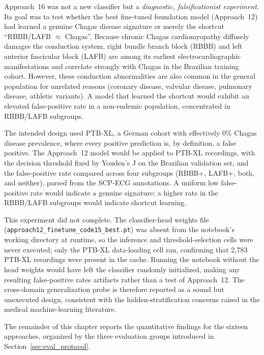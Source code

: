 Approach~16 was not a new classifier but a \emph{diagnostic, falsificationist experiment}. Its goal was to test whether the best fine-tuned foundation model (Approach~12) had learned a genuine Chagas disease signature or merely the shortcut ``RBBB/LAFB $\approx$ Chagas''. Because chronic Chagas cardiomyopathy diffusely damages the conduction system, right bundle branch block (RBBB) and left anterior fascicular block (LAFB) are among its earliest electrocardiographic manifestations and correlate strongly with Chagas in the Brazilian training cohort. However, these conduction abnormalities are also common in the general population for unrelated reasons (coronary disease, valvular disease, pulmonary disease, athletic variants). A model that learned the shortcut would exhibit an elevated false-positive rate in a non-endemic population, concentrated in RBBB/LAFB subgroups.

The intended design used PTB-XL, a German cohort with effectively 0\% Chagas disease prevalence, where every positive prediction is, by definition, a false positive. The Approach~12 model would be applied to PTB-XL recordings, with the decision threshold fixed by Youden's J on the Brazilian validation set, and the false-positive rate compared across four subgroups (RBBB+, LAFB+, both, and neither), parsed from the SCP-ECG annotations. A uniform low false-positive rate would indicate a genuine signature; a higher rate in the RBBB/LAFB subgroups would indicate shortcut learning.

This experiment did not complete. The classifier-head weights file\\ (\texttt{approach12\_finetune\_code15\_best.pt}) was absent from the notebook's working directory at runtime, so the inference and threshold-selection cells were never executed; only the PTB-XL data-loading cell ran, confirming that 2,783 PTB-XL recordings were present in the cache. Running the notebook without the head weights would have left the classifier randomly initialized, making any resulting false-positive rates artifacts rather than a test of Approach~12. The cross-domain generalization probe is therefore reported as a sound but unexecuted design, consistent with the hidden-stratification concerns raised in the medical machine-learning literature.


The remainder of this chapter reports the quantitative findings for the sixteen approaches, organized by the three evaluation groups introduced in Section~\ref{sec:eval_protocol}.

